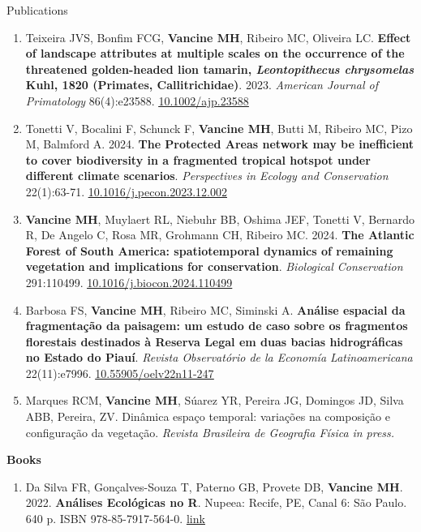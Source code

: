 \documentclass{resume}
\begin{document}
\begin{rSection}{Publications}
\begin{enumerate}
\item Teixeira JVS, Bonfim FCG, {\bf Vancine MH}, Ribeiro MC, Oliveira LC. {\bf Effect of landscape attributes at multiple scales on the occurrence of the threatened golden-headed lion tamarin, \textbf{\textit{Leontopithecus chrysomelas}} Kuhl, 1820 (Primates, Callitrichidae)}. 2023. {\it American Journal of Primatology} 86(4):e23588. \href{https://doi.org/10.1002/ajp.23588}{\underline{10.1002/ajp.23588}}

\item Tonetti V, Bocalini F, Schunck F, {\bf Vancine MH}, Butti M, Ribeiro MC, Pizo M, Balmford A. 2024. {\bf The Protected Areas network may be inefficient to cover biodiversity in a fragmented tropical hotspot under different climate scenarios}. {\it Perspectives in Ecology and Conservation} 22(1):63-71. \href{https://doi.org/10.1016/j.pecon.2023.12.002}{\underline{10.1016/j.pecon.2023.12.002}}

\item {\bf Vancine MH}, Muylaert RL, Niebuhr BB, Oshima JEF, Tonetti V, Bernardo R, De Angelo C, Rosa MR, Grohmann CH, Ribeiro MC. 2024. {\bf The Atlantic Forest of South America: spatiotemporal dynamics of remaining vegetation and implications for conservation}. {\it Biological Conservation} 291:110499. \href{https://doi.org/10.1016/j.biocon.2024.110499}{\underline{10.1016/j.biocon.2024.110499}}

\item Barbosa FS, {\bf Vancine MH}, Ribeiro MC, Siminski A. {\bf Análise espacial da fragmentação da paisagem: um estudo de caso sobre os fragmentos florestais destinados à Reserva Legal em duas bacias hidrográficas no Estado do Piauí}. {\it Revista Observatório de la Economía Latinoamericana} 22(11):e7996. \href{https://doi.org/10.55905/oelv22n11-247}{\underline{10.55905/oelv22n11-247}}

\item Marques RCM, {\bf Vancine MH}, Súarez YR, Pereira JG, Domingos JD, Silva ABB, Pereira, ZV. Dinâmica espaço temporal: variações na composição e configuração da vegetação. {\it Revista Brasileira de Geografia Física} \it{in press.}

\end{enumerate} 

{\bf Books}

\begin{enumerate} 
\item Da Silva FR, Gonçalves-Souza T, Paterno GB, Provete DB, {\bf Vancine MH}. 2022. {\bf Análises Ecológicas no R}. Nupeea: Recife, PE, Canal 6: São Paulo. 640 p. ISBN 978-85-7917-564-0. \href{https://analises-ecologicas.com/}{\underline{link}}
\end{enumerate} 


\end{rSection}
\end{document}
